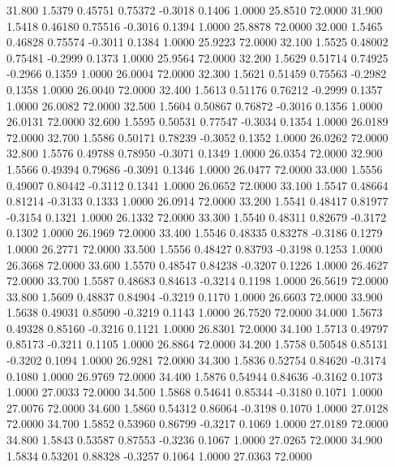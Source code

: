   31.800   1.5379   0.45751   0.75372  -0.3018   0.1406   1.0000  25.8510  72.0000
  31.900   1.5418   0.46180   0.75516  -0.3016   0.1394   1.0000  25.8878  72.0000
  32.000   1.5465   0.46828   0.75574  -0.3011   0.1384   1.0000  25.9223  72.0000
  32.100   1.5525   0.48002   0.75481  -0.2999   0.1373   1.0000  25.9564  72.0000
  32.200   1.5629   0.51714   0.74925  -0.2966   0.1359   1.0000  26.0004  72.0000
  32.300   1.5621   0.51459   0.75563  -0.2982   0.1358   1.0000  26.0040  72.0000
  32.400   1.5613   0.51176   0.76212  -0.2999   0.1357   1.0000  26.0082  72.0000
  32.500   1.5604   0.50867   0.76872  -0.3016   0.1356   1.0000  26.0131  72.0000
  32.600   1.5595   0.50531   0.77547  -0.3034   0.1354   1.0000  26.0189  72.0000
  32.700   1.5586   0.50171   0.78239  -0.3052   0.1352   1.0000  26.0262  72.0000
  32.800   1.5576   0.49788   0.78950  -0.3071   0.1349   1.0000  26.0354  72.0000
  32.900   1.5566   0.49394   0.79686  -0.3091   0.1346   1.0000  26.0477  72.0000
  33.000   1.5556   0.49007   0.80442  -0.3112   0.1341   1.0000  26.0652  72.0000
  33.100   1.5547   0.48664   0.81214  -0.3133   0.1333   1.0000  26.0914  72.0000
  33.200   1.5541   0.48417   0.81977  -0.3154   0.1321   1.0000  26.1332  72.0000
  33.300   1.5540   0.48311   0.82679  -0.3172   0.1302   1.0000  26.1969  72.0000
  33.400   1.5546   0.48335   0.83278  -0.3186   0.1279   1.0000  26.2771  72.0000
  33.500   1.5556   0.48427   0.83793  -0.3198   0.1253   1.0000  26.3668  72.0000
  33.600   1.5570   0.48547   0.84238  -0.3207   0.1226   1.0000  26.4627  72.0000
  33.700   1.5587   0.48683   0.84613  -0.3214   0.1198   1.0000  26.5619  72.0000
  33.800   1.5609   0.48837   0.84904  -0.3219   0.1170   1.0000  26.6603  72.0000
  33.900   1.5638   0.49031   0.85090  -0.3219   0.1143   1.0000  26.7520  72.0000
  34.000   1.5673   0.49328   0.85160  -0.3216   0.1121   1.0000  26.8301  72.0000
  34.100   1.5713   0.49797   0.85173  -0.3211   0.1105   1.0000  26.8864  72.0000
  34.200   1.5758   0.50548   0.85131  -0.3202   0.1094   1.0000  26.9281  72.0000
  34.300   1.5836   0.52754   0.84620  -0.3174   0.1080   1.0000  26.9769  72.0000
  34.400   1.5876   0.54944   0.84636  -0.3162   0.1073   1.0000  27.0033  72.0000
  34.500   1.5868   0.54641   0.85344  -0.3180   0.1071   1.0000  27.0076  72.0000
  34.600   1.5860   0.54312   0.86064  -0.3198   0.1070   1.0000  27.0128  72.0000
  34.700   1.5852   0.53960   0.86799  -0.3217   0.1069   1.0000  27.0189  72.0000
  34.800   1.5843   0.53587   0.87553  -0.3236   0.1067   1.0000  27.0265  72.0000
  34.900   1.5834   0.53201   0.88328  -0.3257   0.1064   1.0000  27.0363  72.0000
